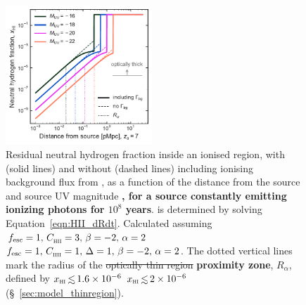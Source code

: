 \documentclass[fleqn,usenatbib]{mnras}
\providecommand{\DIFadd}[1]{{\protect\color{Green} {\bf #1}}} %
\providecommand{\DIFdel}[1]{{\protect\color{Gray} \scriptsize \sout{#1}}} %
\providecommand{\DIFaddFL}[1]{\DIFadd{#1}} %
\providecommand{\DIFdelFL}[1]{\DIFdel{#1}} %
\providecommand{\DIFaddbeginFL}{} %
\providecommand{\DIFaddendFL}{} %
\providecommand{\DIFdelbeginFL}{} %
\providecommand{\DIFdelendFL}{} %
\newcommand{\DIFscaledelfig}{0.5}
\newlength{\DIFdelgraphicswidth} %
\newlength{\DIFdelgraphicsheight} %
\newcommand{\DIFaddincludegraphics}[2][]{{\color{purple}\fbox{\DIFOincludegraphics[#1]{#2}}}} %
\newcommand{\DIFdelincludegraphics}[2][]{%
\sbox{\DIFdelgraphicsbox}{\DIFOincludegraphics[#1]{#2}}%
\settoboxwidth{\DIFdelgraphicswidth}{\DIFdelgraphicsbox} %
\settoboxtotalheight{\DIFdelgraphicsheight}{\DIFdelgraphicsbox} %
\scalebox{\DIFscaledelfig}{%
\parbox[b]{\DIFdelgraphicswidth}{\usebox{\DIFdelgraphicsbox}\\[-\baselineskip] \rule{\DIFdelgraphicswidth}{0em}}\llap{\resizebox{\DIFdelgraphicswidth}{\DIFdelgraphicsheight}{%
\setlength{\unitlength}{\DIFdelgraphicswidth}%
\begin{picture}(1,1)%
\thicklines\linethickness{2pt} %
{\color[rgb]{1,0,0}\put(0,0){\framebox(1,1){}}}%
{\color[rgb]{1,0,0}\put(0,0){\line( 1,1){1}}}%
{\color[rgb]{1,0,0}\put(0,1){\line(1,-1){1}}}%
\end{picture}%
}\hspace*{3pt}}} %
} %
\DeclareRobustCommand{\DIFaddbeginFL}{\DIFOaddbeginFL \let\includegraphics\DIFaddincludegraphics} %
\DeclareRobustCommand{\DIFaddendFL}{\DIFOaddendFL \let\includegraphics\DIFOincludegraphics} %
\DeclareRobustCommand{\DIFdelbeginFL}{\DIFOdelbeginFL \let\includegraphics\DIFdelincludegraphics} %
\DeclareRobustCommand{\DIFdelendFL}{\DIFOaddendFL \let\includegraphics\DIFOincludegraphics} %
\begin{document}
\begin{figure}
    \includegraphics[width=0.49\textwidth]{figs/fig2.pdf}
    \caption{Residual neutral hydrogen fraction inside an ionised region, with (solid lines) and without (dashed lines) including ionising background flux from \citet{Khaire2019}, as a function of the distance from the source and source UV magnitude\DIFaddbeginFL \DIFaddFL{, for a source constantly emitting ionizing photons for $10^8$ years}\DIFaddendFL . \Rion is determined by solving Equation~\eqref{eqn:HII_dRdt}. Calculated assuming \DIFdelbeginFL \DIFdelFL{$\fesc=1, \, \clump=3, \, \beta=-2, \, \alpha = 2$}\DIFdelendFL \DIFaddbeginFL \DIFaddFL{$\fesc=1, \, \clump=1, \, \Delta=1, \, \beta=-2, \, \alpha = 2$}\DIFaddendFL . The dotted vertical lines mark the radius of the \DIFdelbeginFL \DIFdelFL{optically thin region}\DIFdelendFL \DIFaddbeginFL \DIFaddFL{proximity zone}\DIFaddendFL , $R_\alpha$, defined by \DIFdelbeginFL \DIFdelFL{$\xHI \simlt 1.6\times10^{-6}$ }\DIFdelendFL \DIFaddbeginFL \DIFaddFL{$\xHI \simlt 2\times10^{-6}$ }\DIFaddendFL (\S~\ref{sec:model_thinregion}).}
    \label{fig:x_HII_r}
\end{figure}
\end{document}
